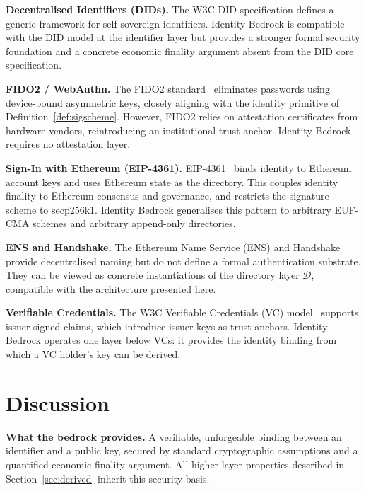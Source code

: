 \documentclass[11pt,a4paper]{article}
\begin{document}
\textbf{Decentralised Identifiers (DIDs).}  The W3C DID specification
\cite{did2022} defines a generic framework for self-sovereign identifiers.
Identity Bedrock is compatible with the DID model at the identifier layer but
provides a stronger formal security foundation and a concrete economic
finality argument absent from the DID core specification.

\textbf{FIDO2 / WebAuthn.}  The FIDO2 standard~\cite{webauthn2021} eliminates
passwords using device-bound asymmetric keys, closely aligning with the
identity primitive of Definition~\ref{def:sigscheme}.  However, FIDO2 relies on attestation
certificates from hardware vendors, reintroducing an institutional trust
anchor.  Identity Bedrock requires no attestation layer.

\textbf{Sign-In with Ethereum (EIP-4361).}  EIP-4361~\cite{eip4361} binds
identity to Ethereum account keys and uses Ethereum state as the directory.
This couples identity finality to Ethereum consensus and governance, and
restricts the signature scheme to secp256k1.  Identity Bedrock generalises
this pattern to arbitrary EUF-CMA schemes and arbitrary append-only
directories.

\textbf{ENS and Handshake.}  The Ethereum Name Service (ENS) and
Handshake~\cite{handshake} provide decentralised naming but do not define a
formal authentication substrate.  They can be viewed as concrete
instantiations of the directory layer $\mathcal{D}$, compatible with the
architecture presented here.

\textbf{Verifiable Credentials.}  The W3C Verifiable Credentials (VC)
model~\cite{vc2019} supports issuer-signed claims, which introduce issuer
keys as trust anchors.  Identity Bedrock operates one layer below VCs: it
provides the identity binding from which a VC holder's key can be derived.

\section{Discussion}
\label{sec:discussion}

\textbf{What the bedrock provides.}  A verifiable, unforgeable binding between
an identifier and a public key, secured by standard cryptographic assumptions
and a quantified economic finality argument.  All higher-layer properties
described in Section~\ref{sec:derived} inherit this security basis.
\end{document}
